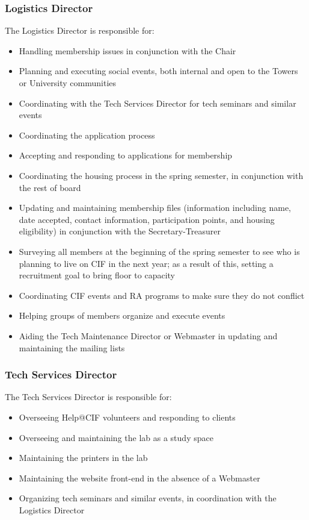\documentclass[12pt]{amsart}
\begin{document}
		\subsubsection {Logistics Director}
The Logistics Director is responsible for:
\begin{itemize}
	\item Handling membership issues in conjunction with the Chair
	\item Planning and executing social events, both internal and open to the Towers or University communities
	\item Coordinating with the Tech Services Director for tech seminars and similar events
	\item Coordinating the application process
	\item Accepting and responding to applications for membership
	\item Coordinating the housing process in the spring semester, in conjunction with the rest of board
	\item Updating and maintaining membership files (information including name, date accepted, contact information, participation points, and housing eligibility) in conjunction with the Secretary-Treasurer
	\item Surveying all members at the beginning of the spring semester to see who is planning to live on CIF in the next year; as a result of this, setting a recruitment goal to bring floor to capacity
	\item Coordinating CIF events and RA programs to make sure they do not conflict
	\item Helping groups of members organize and execute events
	\item Aiding the Tech Maintenance Director or Webmaster in updating and maintaining the mailing lists
\end{itemize}
		\subsubsection {Tech Services Director}
The Tech Services Director is responsible for:
\begin{itemize}
	\item Overseeing Help@CIF volunteers and responding to clients
	\item Overseeing and maintaining the lab as a study space
	\item Maintaining the printers in the lab
	\item Maintaining the website front-end in the absence of a Webmaster
	\item Organizing tech seminars and similar events, in coordination with the Logistics Director
\end{itemize}
\end{document}
